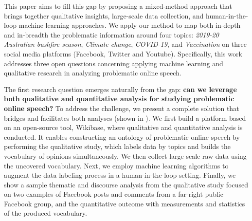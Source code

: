 This paper aims to fill this gap by proposing a mixed-method approach that brings together qualitative insights, large-scale data collection, and human-in-the-loop machine learning approaches.
We apply our method to map both in-depth and in-breadth the problematic information around four topics: \textit{2019-20 Australian bushfire season}, \textit{Climate change}, \textit{COVID-19}, and \textit{Vaccination} on three social media platforms (Facebook, Twitter and Youtube).
Specifically, this work addresses three open questions concerning applying machine learning and qualitative research in analyzing problematic online speech.



The first research question emerges naturally from the gap: \textbf{can we leverage both qualitative and quantitative analysis for studying problematic online speech?}
To address the challenge, we present a complete solution that bridges and facilitates both analyses (shown in ). We first build a platform based on an open-source tool, Wikibase, where qualitative and quantitative analysis is conducted. 
It enables constructing an ontology of problematic online speech by performing the qualitative study, which labels data by topics and builds the vocabulary of opinions simultaneously. 
We then collect large-scale raw data using the uncovered vocabulary. 
Next, we employ machine learning algorithms to augment the data labeling process in a human-in-the-loop setting. 
Finally, we show a sample thematic and discourse analysis from the qualitative study focused on two examples of Facebook posts and comments from a far-right public Facebook group, and the quantitative outcome with measurements and statistics of the produced vocabulary.

